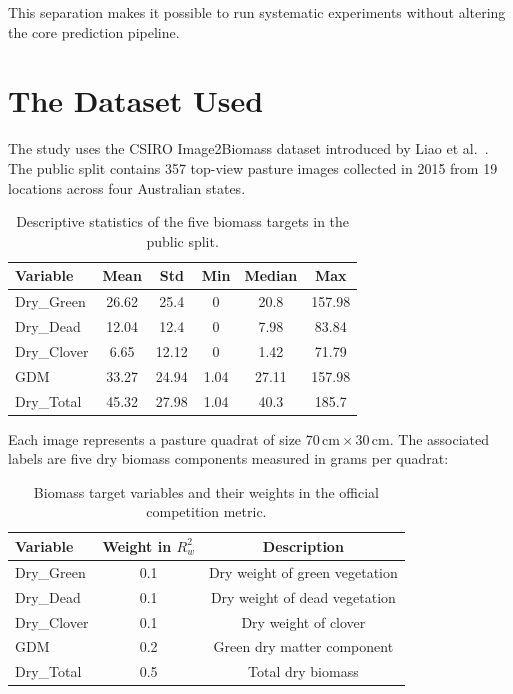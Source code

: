 This separation makes it possible to run systematic experiments without altering the core prediction pipeline.

\section{The Dataset Used}

The study uses the CSIRO Image2Biomass dataset introduced by Liao et al.~\cite{liao2025estimating}. The public split contains 357 top-view pasture images collected in 2015 from 19 locations across four Australian states.

\begin{table}[htbp]
\centering
\caption{Descriptive statistics of the five biomass targets in the public split.}
\label{tab:dataset_stats}
\small

\begin{threeparttable}
\begin{tabular}{lccccc}
\hline
\textbf{Variable} & \textbf{Mean} & \textbf{Std} & \textbf{Min} & \textbf{Median} & \textbf{Max} \\
\hline
Dry\_Green & 26.62 & 25.4 & 0 & 20.8 & 157.98 \\
Dry\_Dead & 12.04 & 12.4 & 0 & 7.98 & 83.84 \\
Dry\_Clover & 6.65 & 12.12 & 0 & 1.42 & 71.79 \\
GDM & 33.27 & 24.94 & 1.04 & 27.11 & 157.98 \\
Dry\_Total & 45.32 & 27.98 & 1.04 & 40.3 & 185.7 \\
\hline
\end{tabular}

\end{threeparttable}
\end{table}

Each image represents a pasture quadrat of size $70\,\text{cm} \times 30\,\text{cm}$. The associated labels are five dry biomass components measured in grams per quadrat:

\begin{table}[htbp]
\centering
\caption{Biomass target variables and their weights in the official competition metric.}
\label{tab:target_variables}
\begin{tabular}{lcc}
\hline
\textbf{Variable} & \textbf{Weight in $R^2_w$} & \textbf{Description} \\
\hline
Dry\_Green  & 0.1 & Dry weight of green vegetation \\
Dry\_Dead   & 0.1 & Dry weight of dead vegetation \\
Dry\_Clover & 0.1 & Dry weight of clover \\
GDM         & 0.2 & Green dry matter component \\
Dry\_Total  & 0.5 & Total dry biomass \\
\hline
\end{tabular}
\end{table}

